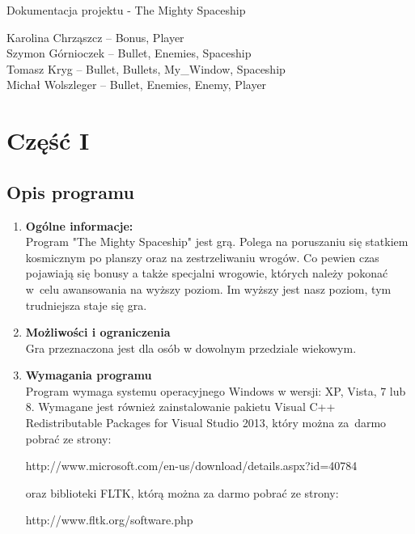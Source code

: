 \documentclass{article}
\begin{document}
\begin{normalsize}

\begin{center}
\Huge
{Dokumentacja projektu - The Mighty Spaceship}\\
\end{center}
\Large
{Karolina Chrząszcz -- Bonus, Player}\\
{Szymon Górnioczek -- Bullet, Enemies, Spaceship}\\
{Tomasz Kryg -- Bullet, Bullets, My\_Window, Spaceship}\\
{Michał Wolszleger -- Bullet, Enemies, Enemy, Player}\\

\section*{Część I}
	\subsection*{Opis programu}
		\begin{enumerate}
			\item \textbf{Ogólne informacje:}\\
			Program "The Mighty Spaceship" jest grą. Polega na poruszaniu się statkiem kosmicznym po planszy oraz na zestrzeliwaniu wrogów. Co pewien czas pojawiają się bonusy a także specjalni wrogowie, których należy pokonać w~celu awansowania na wyższy poziom. Im wyższy jest nasz poziom, tym trudniejsza staje się gra.
			\item \textbf{Możliwości i ograniczenia}\\
			Gra przeznaczona jest dla osób w dowolnym przedziale wiekowym.
			\item \textbf{Wymagania programu}\\
			Program wymaga systemu operacyjnego Windows w wersji: XP, Vista, 7 lub 8. Wymagane jest również zainstalowanie pakietu Visual C++ Redistributable Packages for Visual Studio 2013, który można za~darmo pobrać ze strony:
\begin{center}
http://www.microsoft.com/en-us/download/details.aspx?id=40784
\end{center}

oraz biblioteki FLTK, którą można za darmo pobrać ze strony:
\begin{center}
http://www.fltk.org/software.php
\end{center}


		\end{enumerate}
		

\end{normalsize}
\end{document}
